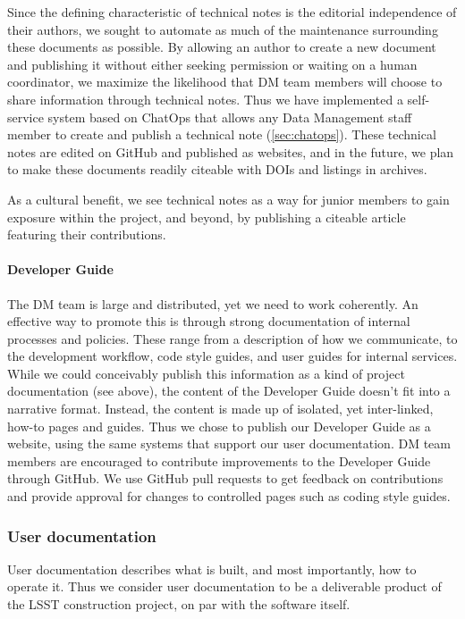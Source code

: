 Since the defining characteristic of technical notes is the editorial independence of their authors, we sought to automate as much of the maintenance surrounding these documents as possible.
By allowing an author to create a new document and publishing it without either seeking permission or waiting on a human coordinator, we maximize the likelihood that DM team members will choose to share information through technical notes.
Thus we have implemented a self-service system based on ChatOps that allows any Data Management staff member to create and publish a technical note (\ref{sec:chatops}).
These technical notes are edited on GitHub and published as websites, and in the future, we plan to make these documents readily citeable with DOIs and listings in archives.

As a cultural benefit, we see technical notes as a way for junior members to gain exposure within the project, and beyond, by publishing a citeable article featuring their contributions.

\paragraph{Developer Guide}

The DM team is large and distributed, yet we need to work coherently.
An effective way to promote this is through strong documentation of internal processes and policies.
These range from a description of how we communicate, to the development workflow, code style guides, and user guides for internal services.
While we could conceivably publish this information as a kind of project documentation (see above), the content of the Developer Guide doesn't fit into a narrative format.
Instead, the content is made up of isolated, yet inter-linked, how-to pages and guides.
Thus we chose to publish our Developer Guide as a website,\cite{devguide} using the same systems that support our user documentation.
DM team members are encouraged to contribute improvements to the Developer Guide through GitHub.
We use GitHub pull requests to get feedback on contributions and provide approval for changes to controlled pages such as coding style guides.

\subsubsection{User documentation}
\label{sec:user_docs}

User documentation describes what is built, and most importantly, how to operate it.
Thus we consider user documentation to be a deliverable product of the LSST construction project, on par with the software itself.

